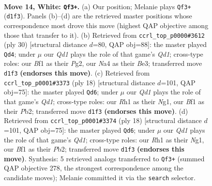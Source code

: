 \documentclass[11pt]{article}
\begin{document}
\clearpage

\begin{figure}[p]\centering
\begin{subfigure}{0.46\textwidth}\centering
\resizebox{\linewidth}{!}{%
\newchessgame
\chessboard[
  setfen={rnb4r/1ppn1k2/4p3/p2p3p/N2P3q/8/PPP2NPP/R2QKB1R w KQ - 0 14},
  showmover=false,
  pgfstyle=straightmove, color=movearrow, markmove={d1-f3}
]}
\caption{}
\end{subfigure}\hfill
\begin{subfigure}{0.46\textwidth}\centering
\resizebox{\linewidth}{!}{%
\newchessgame
\chessboard[
  setfen={rn3rk1/pp3ppp/3p1n2/q2P4/8/2N1B3/PPP3PP/R2QR1K1 w - - 3 16},
  showmover=false,
  pgfstyle=straightmove, color=movearrow, markmove={d1-d4}
]}
\caption{}
\end{subfigure}
\\[4pt]
\begin{subfigure}{0.46\textwidth}\centering
\resizebox{\linewidth}{!}{%
\newchessgame
\chessboard[
  setfen={r1b1k1nr/p4ppp/npp1p3/B7/2P1q3/8/PP2BPPP/R2QK1NR w KQkq - 0 10},
  showmover=false,
  pgfstyle=straightmove, color=movearrow, markmove={d1-d6}
]}
\caption{}
\end{subfigure}\hfill
\begin{subfigure}{0.46\textwidth}\centering
\resizebox{\linewidth}{!}{%
\newchessgame
\chessboard[
  setfen={r1b1k1nr/p4ppp/npp1p3/B7/2P1q3/8/PP2BPPP/R2QK1NR w KQkq - 0 10},
  showmover=false,
  pgfstyle=straightmove, color=movearrow, markmove={d1-d6}
]}
\caption{}
\end{subfigure}
\caption{\textbf{Move 14, White: \texttt{Qf3+}.} (a) Our position; Melanie plays \texttt{Qf3+} (\texttt{d1f3}). Panels (b)--(d) are the retrieved master positions whose correspondence most drove this move (highest QAP objective among those that transfer to it). (b) Retrieved from \texttt{ccrl\_top\_p0000\#3612} (ply 30) [structural distance $d$=80, QAP obj=88]: the master played \texttt{Qd4}; under $\mu$ our \emph{Qd1} plays the role of that game's \emph{Qd1}; cross-type roles: our \emph{B}f1 as their \emph{P}g2, our \emph{N}a4 as their \emph{B}e3; transferred move \texttt{d1f3} \textbf{(endorses this move)}. (c) Retrieved from \texttt{ccrl\_top\_p0001\#3373} (ply 18) [structural distance $d$=101, QAP obj=75]: the master played \texttt{Qd6}; under $\mu$ our \emph{Qd1} plays the role of that game's \emph{Qd1}; cross-type roles: our \emph{R}h1 as their \emph{N}g1, our \emph{B}f1 as their \emph{P}b2; transferred move \texttt{d1f3} \textbf{(endorses this move)}. (d) Retrieved from \texttt{ccrl\_top\_p0001\#3374} (ply 18) [structural distance $d$=101, QAP obj=75]: the master played \texttt{Qd6}; under $\mu$ our \emph{Qd1} plays the role of that game's \emph{Qd1}; cross-type roles: our \emph{R}h1 as their \emph{N}g1, our \emph{B}f1 as their \emph{P}b2; transferred move \texttt{d1f3} \textbf{(endorses this move)}. Synthesis: 5 retrieved analogs transferred to \texttt{Qf3+} (summed QAP objective 278, the strongest correspondence among the candidate moves); Melanie committed it via the \texttt{search} selector.}
\label{fig:thought-m26}
\end{figure}
\end{document}
